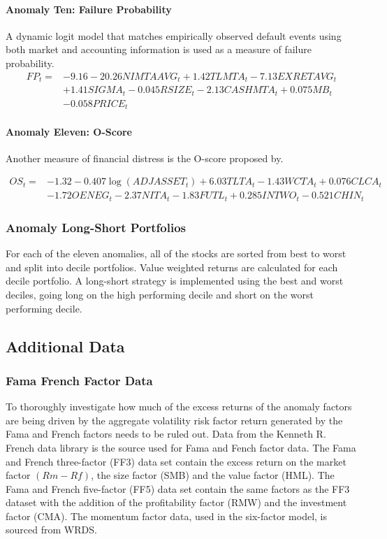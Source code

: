 \documentclass[12pt, a4paper, oneside]{article}
\begin{document}
\paragraph*{Anomaly Ten: Failure Probability }
A dynamic logit model that matches empirically observed default events using both market and accounting information is used as a measure of failure probability. 
\begin{align*}
    FP_t =  &- 9.16 - 20.26 NIMTAAVG_t+ 1.42 TLMTA_t  - 7.13 EXRETAVG_t \\
    &+ 1.41 SIGMA_t  - 0.045 RSIZE_t - 2.13 CASHMTA_t + 0.075 MB_t \\
    &- 0.058 PRICE_t
\end{align*}

\paragraph*{Anomaly Eleven: O-Score}
Another measure of financial distress is the O-score proposed by\cite{ohlson1980financial}.

\begin{align*}
    OS_t = &- 1.32 - 0.407 \log (ADJASSET_t )  + 6.03 TLTA_t- 1.43 WCTA_t+ 0.076 CLCA_t \\
    &- 1.72O ENEG_t- 2.37 NITA_t- 1.83 FUTL_t+ 0.285 INTWO_t- 0.521 CHIN_t
\end{align*}

\subsubsection{Anomaly Long-Short Portfolios}
For each of the eleven anomalies, all of the stocks are sorted from best to worst and split into decile portfolios. Value weighted returns are calculated for each decile portfolio. A long-short strategy is implemented using the best and worst deciles, going long on the high performing decile and short on the worst performing decile. 

\subsection{Additional Data}
\subsubsection{Fama French Factor Data}
To thoroughly investigate how much of the excess returns of the anomaly factors are being driven by the aggregate volatility risk factor return generated by the Fama and French factors needs to be ruled out. Data from the Kenneth R. French data library is the source used for Fama and Fench factor data. The Fama and French three-factor (FF3) data set contain the excess return on the market factor $(Rm - Rf)$, the size factor (SMB) and the value factor (HML). The Fama and French five-factor (FF5) data set contain the same factors as the FF3 dataset with the addition of the profitability factor (RMW) and the investment factor (CMA). The momentum factor data, used in the six-factor model, is sourced from WRDS.
\end{document}

